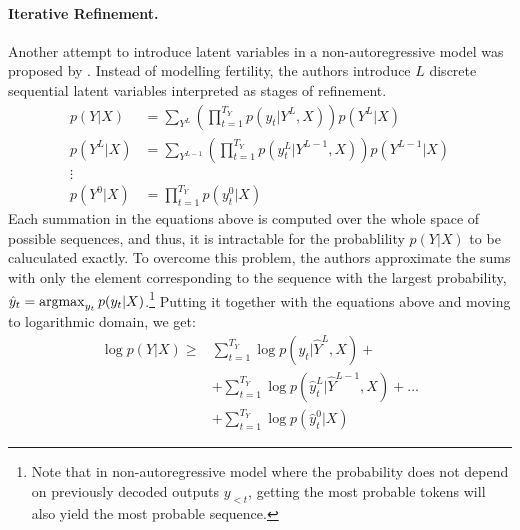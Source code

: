 \paragraph{Iterative Refinement.} Another attempt to introduce latent variables
in a non-autoregressive model was proposed by \citet{lee2018deterministic}.
Instead of modelling fertility, the authors introduce $L$ discrete sequential latent
variables interpreted as stages of refinement.
%
 \begin{align*}
  p(Y|X) & = \sum_{Y^L}
           \left( \prod_{t=1}^{T_Y} p(y_t|Y^L, X) \right) p(Y^L|X) \\
  p(Y^L|X) & = \sum_{Y^{L-1}}
             \left( \prod_{t=1}^{T_Y} p(y_t^L | Y^{L-1}, X) \right)
             p(Y^{L-1}|X) \\
  \vdots \nonumber \\
  p(Y^0|X) & = \prod_{t=1}^{T_Y} p(y_t^0|X)
\end{align*}
Each summation in the equations above is computed over the whole space of
possible sequences, and thus, it is intractable for the probablility $p(Y|X)$ to
be caluculated exactly. To overcome this problem, the authors approximate the
sums with only the element corresponding to the sequence with the largest
probability, $\hat{y}_t = \operatorname*{argmax}_{y_t}p(y_t|X)$.\footnote{Note that in
  non-autoregressive model where the probability does not depend on previously
  decoded outputs $y_{<t}$, getting the most probable tokens will also yield the
  most probable sequence.}  Putting it together with the equations above and
moving to logarithmic domain, we get:
\begin{align}
  \log p(Y|X) \geq
    & \sum_{t=1}^{T_Y} \log p(y_t| \hat{Y}^L, X) + \\
    & + \sum_{t=1}^{T_Y} \log p(\hat{y}_t^{L}| \hat{Y}^{L-1}, X) + \ldots \\
    & + \sum_{t=1}^{T_Y} \log p(\hat{y}_t^0 | X) \label{eq:refinement-lowerbound}
\end{align}

